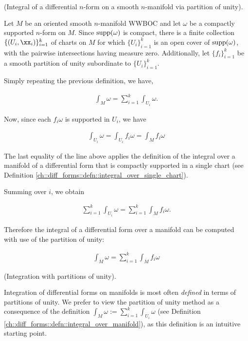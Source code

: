 \begin{theorem}
\label{ch::diff_forms::thm::integral_via_partition_of_unity}

    (Integral of a differential $n$-form on a smooth $n$-manifold via partition of unity).
    
    Let $M$ be an oriented smooth $n$-manifold WWBOC and let $\omega$ be a compactly supported $n$-form on $M$. Since $\text{supp}(\omega)$ is compact, there is a finite collection $\{(U_i, \xx_i)\}_{i = 1}^k$ of charts on $M$ for which $\{U_i\}_{i = 1}^k$ is an open cover of $\text{supp}(\omega)$, with the pairwise intersections having measure zero. Additionally, let $\{f_i\}_{i = 1}^k$ be a smooth partition of unity subordinate to $\{U_i\}_{i = 1}^k$.
    
    Simply repeating the previous definition, we have,  

    \begin{align*}
        \int_M \omega = \sum_{i = 1}^k \int_{U_i} \omega.
    \end{align*}
    
    Now, since each $f_i \omega$ is supported in $U_i$, we have
    
    \begin{align*}
        \int_{U_i} \omega = \int_{U_i} f_i \omega = \int_M f_i \omega
    \end{align*}

    The last equality of the line above applies the definition of the integral over a manifold of a differential form that is compactly supported in a single chart (see Definition \ref{ch::diff_forms::defn::integral_over_single_chart}).
    
    Summing over $i$, we obtain
    
    \begin{align*}
        \sum_{i = 1}^k \int_{U_i} \omega = \sum_{i = 1}^k \int_M f_i \omega.
    \end{align*}
    
    Therefore the integral of a differential form over a manifold can be computed with use of the partition of unity:
    
    \begin{align*}
        \boxed
        {
            \int_M \omega = \sum_{i = 1}^k \int_M f_i \omega
        }
    \end{align*}
\end{theorem}

\begin{remark}
    (Integration with partitions of unity).
    
    Integration of differential forms on manifolds is most often \textit{defined} in terms of partitions of unity. We prefer to view the partition of unity method as a consequence of the definition $\int_M \omega := \sum_{i = 1}^k \int_{U_i} \omega$ (see Definition \ref{ch::diff_forms::defn::integral_over_manifold}), as this definition is an intuitive starting point.
\end{remark}

